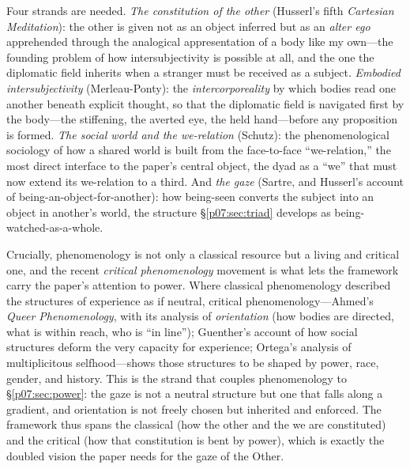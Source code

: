 \documentclass[11pt,a4paper]{article}
\begin{document}
Four strands are needed. \emph{The constitution of the other} (Husserl's fifth \emph{Cartesian Meditation}): the other is given not as an object inferred but as an \emph{alter ego} apprehended through the analogical appresentation of a body like my own---the founding problem of how intersubjectivity is possible at all, and the one the diplomatic field inherits when a stranger must be received as a subject. \emph{Embodied intersubjectivity} (Merleau-Ponty): the \emph{intercorporeality} by which bodies read one another beneath explicit thought, so that the diplomatic field is navigated first by the body---the stiffening, the averted eye, the held hand---before any proposition is formed. \emph{The social world and the we-relation} (Schutz): the phenomenological sociology of how a shared world is built from the face-to-face ``we-relation,'' the most direct interface to the paper's central object, the dyad as a ``we'' that must now extend its we-relation to a third. And \emph{the gaze} (Sartre, and Husserl's account of being-an-object-for-another): how being-seen converts the subject into an object in another's world, the structure §\ref{p07:sec:triad} develops as being-watched-as-a-whole.

Crucially, phenomenology is not only a classical resource but a living and critical one, and the recent \emph{critical phenomenology} movement is what lets the framework carry the paper's attention to power. Where classical phenomenology described the structures of experience as if neutral, critical phenomenology---Ahmed's \emph{Queer Phenomenology}, with its analysis of \emph{orientation} (how bodies are directed, what is within reach, who is ``in line''); Guenther's account of how social structures deform the very capacity for experience; Ortega's analysis of multiplicitous selfhood---shows those structures to be shaped by power, race, gender, and history. This is the strand that couples phenomenology to §\ref{p07:sec:power}: the gaze is not a neutral structure but one that falls along a gradient, and orientation is not freely chosen but inherited and enforced. The framework thus spans the classical (how the other and the we are constituted) and the critical (how that constitution is bent by power), which is exactly the doubled vision the paper needs for the gaze of the Other.
\end{document}
